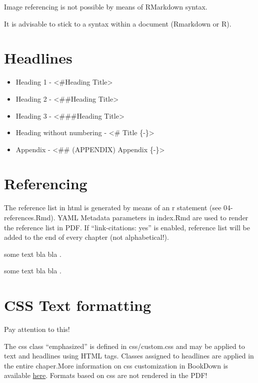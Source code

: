 \documentclass[]{book}
\providecommand{\tightlist}{%
  \setlength{\itemsep}{0pt}\setlength{\parskip}{0pt}}
\theoremstyle{definition}
\theoremstyle{definition}
\theoremstyle{definition}
\theoremstyle{remark}
\let\BeginKnitrBlock\begin \let\EndKnitrBlock\end
\begin{document}
\BeginKnitrBlock{rmdcaution}
Image referencing is not possible by means of RMarkdown syntax.
\EndKnitrBlock{rmdcaution}

\BeginKnitrBlock{rmdtip}
It is advisable to stick to a syntax within a document (Rmarkdown or R).
\EndKnitrBlock{rmdtip}

\section{Headlines}\label{headlines}

\begin{itemize}
\tightlist
\item
  Heading 1 - \textless{}\#Heading Title\textgreater{}
\item
  Heading 2 - \textless{}\#\#Heading Title\textgreater{}
\item
  Heading 3 - \textless{}\#\#\#Heading Title\textgreater{}
\item
  Heading without numbering - \textless{}\# Title \{-\}\textgreater{}
\item
  Appendix - \textless{}\#\# (APPENDIX) Appendix \{-\}\textgreater{}
\end{itemize}

\section{Referencing}\label{referencing}

\BeginKnitrBlock{rmdtip}
The reference list in html is generated by means of an r statement (see
04-references.Rmd). YAML Metadata parameters in index.Rmd are used to
render the reference list in PDF. If ``link-citations: yes'' is enabled,
reference list will be added to the end of every chapter (not
alphabetical!).
\EndKnitrBlock{rmdtip}

\citep{holland1992}

some text bla bla \citep{alexandrowicz1980}.

\citep{grimm2005}

some text bla bla \citet{eden1961}.

\section{CSS Text formatting}\label{css-text-formatting}

{Pay attention to this!}

\BeginKnitrBlock{rmdcomment}
The css class ``emphasized'' is defined in css/custom.css and may be
applied to text and headlines using HTML tags. Classes assigned to
headlines are applied in the entire chaper.More information on css
customization in BookDown is available
\href{https://bookdown.org/yihui/rmarkdown/custom-css-1.html}{here}.
Formats based on css are not rendered in the PDF!
\EndKnitrBlock{rmdcomment}
\end{document}
